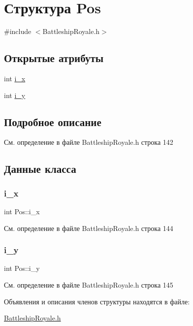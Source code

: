 \hypertarget{struct_pos}{}\section{Структура Pos}
\label{struct_pos}


{\ttfamily \#include $<$Battleship\+Royale.\+h$>$}

\subsection*{Открытые атрибуты}
\begin{DoxyCompactItemize}
\item 
int \mbox{\hyperlink{struct_pos_af3b15cd413e7dfc28b96cd6f87d280c3}{i\+\_\+x}}
\item 
int \mbox{\hyperlink{struct_pos_a6896c1bbe42f37baddb4d6fb906fa880}{i\+\_\+y}}
\end{DoxyCompactItemize}


\subsection{Подробное описание}


См. определение в файле Battleship\+Royale.\+h строка 142



\subsection{Данные класса}
\mbox{\label{struct_pos_af3b15cd413e7dfc28b96cd6f87d280c3}} 
\subsubsection{\texorpdfstring{i\_x}{i\_x}}
{\footnotesize\ttfamily int Pos\+::i\+\_\+x}



См. определение в файле Battleship\+Royale.\+h строка 144

\mbox{\label{struct_pos_a6896c1bbe42f37baddb4d6fb906fa880}} 
\subsubsection{\texorpdfstring{i\_y}{i\_y}}
{\footnotesize\ttfamily int Pos\+::i\+\_\+y}



См. определение в файле Battleship\+Royale.\+h строка 145



Объявления и описания членов структуры находятся в файле\+:\begin{DoxyCompactItemize}
\item 
\mbox{\hyperlink{_battleship_royale_8h}{Battleship\+Royale.\+h}}\end{DoxyCompactItemize}
